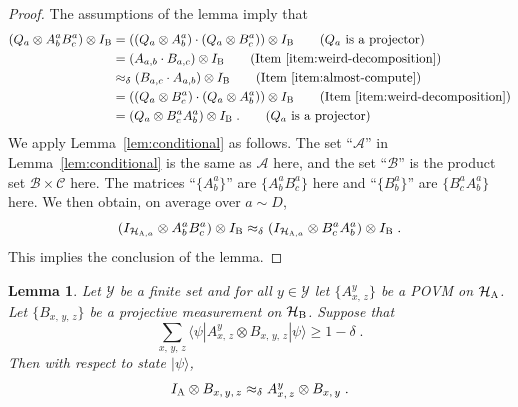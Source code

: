 \documentclass[11pt]{article}
\newtheorem{lemma}[theorem]{Lemma}
\theoremstyle{definition}
\newcommand{\ket}[1]{|#1\rangle}
\newcommand{\bra}[1]{\langle#1|}
\newcommand{\Id}{\ensuremath{I}}
\newcommand{\mA}{\ensuremath{\mathcal{A}}}
\newcommand{\mB}{\ensuremath{\mathcal{B}}}
\newcommand{\mC}{\ensuremath{\mathcal{C}}}
\newcommand{\mH}{\ensuremath{\mathcal{H}}}
\newcommand{\ia}{\Id_\alice}
\newcommand{\labelstyle}[1]{\ensuremath{\textsc{#1}}\xspace}
\newcommand{\alice}{\labelstyle{A}}
\newcommand{\bob}{\labelstyle{B}}
\renewcommand{\cal}[1]{\mathcal{#1}}
\begin{document}
\begin{proof}
  The assumptions of the lemma imply that
  \begin{align*}
    (Q_a \otimes A^a_b B^a_c) \otimes \Id_\bob
    & = ((Q_a \otimes A^a_b) \cdot (Q_a \otimes B^a_c)) \otimes \Id_\bob
      \tag{$Q_a$ is a projector}\\
    & = (A_{a, b} \cdot B_{a, c}) \otimes \Id_\bob
      \tag{Item~\ref{item:weird-decomposition}}\\
    & \approx_\delta (B_{a, c} \cdot A_{a, b}) \otimes \Id_\bob
      \tag{Item~\ref{item:almost-compute}}\\
    & = ((Q_a \otimes B^a_c) \cdot (Q_a \otimes A^a_b)) \otimes \Id_\bob
      \tag{Item~\ref{item:weird-decomposition}}\\
    & = (Q_a \otimes B^a_c A^a_b) \otimes \Id_\bob\;.
      \tag{$Q_a$ is a projector}
  \end{align*}
  We apply Lemma~\ref{lem:conditional} as follows.
  The set ``$\mA$'' in Lemma~\ref{lem:conditional} is the same as $\cal{A}$
  here, and the set ``$\mB$'' is the product set $\mB \times \mC$ here.
  The matrices ``$\{A^a_b\}$'' are $\{A^a_{b}B^a_c\}$ here and ``$\{B^{a}_b\}$''
  are $\{B^a_c A^a_{b}\}$ here.
  We then obtain, on average over $a \sim
  D$,
  \begin{equation*}
    (\Id_{\mH_{\alice, a}}\otimes A^{a}_b B^a_c) \otimes \Id_\bob
    \approx_\delta (\Id_{\mH_{\alice, a}} \otimes B^{a}_c A^a_b) \otimes \Id_\bob\;.
  \end{equation*}
  This implies the conclusion of the lemma.
\end{proof}

\begin{lemma}
  \label{lem:conditional-consistency}
	Let $ \cal{Y}$ be a finite set and for all $y\in \cal{Y}$ let $\{A^y_{x,\, z}\}$ be a POVM on $\mH_\alice$. Let 
  $\{B_{x,\, y,\, z}\}$ be a projective measurement on $\mH_\bob$.
  Suppose that
  \begin{equation}\label{eq:cc-1}
    \sum_{x,\, y,\, z} \bra{\psi} A^y_{x,\, z} \otimes B_{x,\, y,\, z}
    \ket{\psi} \ge 1 - \delta\;.
  \end{equation}
  Then with respect to state $\ket{\psi}$,
  \begin{equation*}
    \ia \otimes B_{x,\, y,\, z} \approx_\delta A^y_{x,\, z} \otimes B_{x,\,
      y}\;.
  \end{equation*}
\end{lemma}
\end{document}
